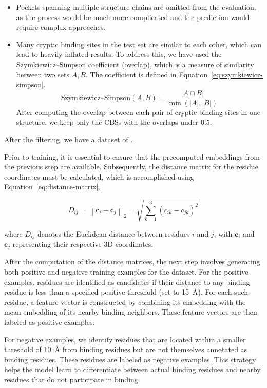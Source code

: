 \begin{itemize}
    \item Pockets spanning multiple structure chains are omitted from the evaluation, as the process would be much more complicated and the prediction would require complex approaches.
    \item Many cryptic binding sites in the test set are similar to each other, which can lead to heavily inflated results. To address this, we have used the Szymkiewicz–Simpson coefficient (overlap), which is a measure of similarity between two sets $A, B$. The coefficient is defined in Equation~\ref{eq:szymkiewicz-simpson}.
    \begin{equation}
        \text{Szymkiewicz–Simpson}(A, B) = \frac{|A \cap B|}{\min(|A|, |B|)}
        \label{eq:szymkiewicz-simpson}
    \end{equation}
    After computing the overlap between each pair of cryptic binding sites in one structure, we keep only the CBSs with the overlaps under 0.5.
\end{itemize}

After the filtering, we have a dataset of .

Prior to training, it is essential to ensure that the precomputed embeddings from the previous step are available. Subsequently, the distance matrix for the residue coordinates must be calculated, which is accomplished using Equation~\ref{eq:distance-matrix}.

\begin{equation}
D_{ij} = \left\| \mathbf{c}_i - \mathbf{c}_j \right\|_2 = \sqrt{ \sum_{k=1}^3 (c_{ik} - c_{jk})^2 }
\label{eq:distance-matrix}
\end{equation}

where $D_{ij}$ denotes the Euclidean distance between residues $i$ and $j$, with $\mathbf{c}_i$ and $\mathbf{c}_j$ representing their respective 3D coordinates.

After the computation of the distance matrices, the next step involves generating both positive and negative training examples for the dataset. For the positive examples, residues are identified as candidates if their distance to any binding residue is less than a specified positive threshold (set to 15~\AA). For each such residue, a feature vector is constructed by combining its embedding with the mean embedding of its nearby binding neighbors. These feature vectors are then labeled as positive examples.

For negative examples, we identify residues that are located within a smaller threshold of 10~\AA{} from binding residues but are not themselves annotated as binding residues. These residues are labeled as negative examples. This strategy helps the model learn to differentiate between actual binding residues and nearby residues that do not participate in binding.

